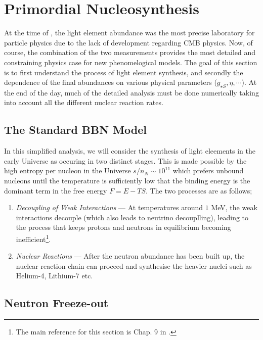 \documentclass[11pt]{article}
\numberwithin{equation}{section}
\numberwithin{figure}{section}
\numberwithin{table}{section}
\begin{document}
\section{Primordial Nucleosynthesis}


At the time of \citet{Sarkar:1995dd}, the light element abundance was the most precise laboratory for particle physics due to the lack of development regarding CMB physics. Now, of course, the combination of the two measurements provides the most detailed and constraining physics case for new phenomelogical models. The goal of this section is to first understand the process of light element synthesis, and secondly the dependence of the final abundances on various physical parameters ($g_{\star S}, \eta, \cdots$). At the end of the day, much of the detailed analysis must be done numerically taking into account all the different nuclear reaction rates.


\subsection{The Standard BBN Model}


In this simplified analysis, we will consider the synthesis of light eleements in the early Universe as occuring in two distinct stages. This is made possible by the high entropy per nucleon in the Universe $s/n_N \sim 10^{11}$ which prefers unbound nucleons until the temperature is sufficiently low that the binding energy is the dominant term in the free energy $F = E - TS$. The two processes are as follows;
\begin{enumerate}
\item \textit{Decoupling of Weak Interactions} --- At temperatures around $1$ MeV, the weak interactions decouple (which also leads to neutrino decouplling), leading to the process that keeps protons and neutrons in equilibrium becoming inefficient\footnote{The main reference for this section is Chap. 9 in \citet{Bernstein:1988bw}.}.
\item \textit{Nuclear Reactions} --- After the neutron abundance has been built up, the nuclear reaction chain can proceed and synthesise the heavier nuclei such as Helium-4, Lithium-7 etc.  
\end{enumerate}



\subsection{Neutron Freeze-out}
\end{document}
